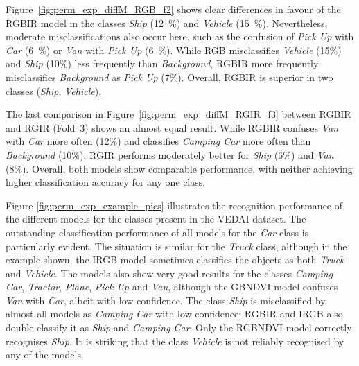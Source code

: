 Figure~\ref{fig:perm_exp_diffM_RGB_f2} shows clear differences in favour of the RGBIR model in the classes \textit{Ship} (12~\%) and \textit{Vehicle} (15~\%). Nevertheless, moderate misclassifications also occur here, such as the confusion of \textit{Pick Up} with \textit{Car} (6~\%) or \textit{Van} with \textit{Pick Up} (6~\%). While RGB misclassifies \textit{Vehicle} (15\%) and \textit{Ship} (10\%) less frequently than \textit{Background}, RGBIR more frequently misclassifies \textit{Background} as \textit{Pick Up} (7\%). Overall, RGBIR is superior in two classes (\textit{Ship}, \textit{Vehicle}).



The last comparison in Figure~\ref{fig:perm_exp_diffM_RGIR_f3} between RGBIR and RGIR (Fold~3) shows an almost equal result. While RGBIR confuses \textit{Van} with \textit{Car} more often (12\%) and classifies \textit{Camping Car} more often than \textit{Background} (10\%), RGIR performs moderately better for \textit{Ship} (6\%) and \textit{Van} (8\%). Overall, both models show comparable performance, with neither achieving higher classification accuracy for any one class.

Figure \ref{fig:perm_exp_example_pics} illustrates the recognition performance of the different models for the classes present in the \acrshort{VEDAI} dataset. The outstanding classification performance of all models for the \textit{Car} class is particularly evident. The situation is similar for the \textit{Truck} class, although in the example shown, the IRGB model sometimes classifies the objects as both \textit{Truck} and \textit{Vehicle}. The models also show very good results for the classes \textit{Camping Car}, \textit{Tractor}, \textit{Plane}, \textit{Pick Up} and \textit{Van}, although the GBNDVI model confuses \textit{Van} with \textit{Car}, albeit with low confidence. The class \textit{Ship} is misclassified by almost all models as \textit{Camping Car} with low confidence; RGBIR and IRGB also double-classify it as \textit{Ship} and \textit{Camping Car}. Only the RGBNDVI model correctly recognises \textit{Ship}. It is striking that the class \textit{Vehicle} is not reliably recognised by any of the models.



\FloatBarrier






